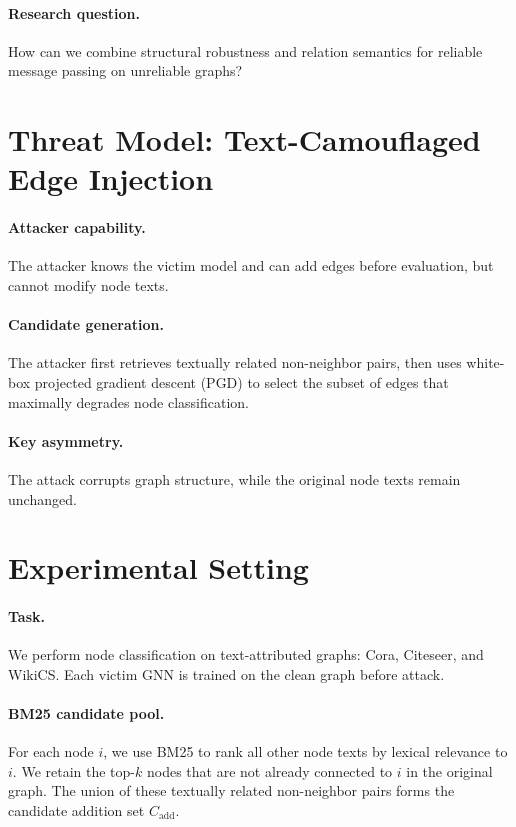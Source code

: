 \documentclass{article}
\begin{document}
\paragraph{Research question.}
How can we combine structural robustness and relation semantics for reliable
message passing on unreliable graphs?

\section{Threat Model: Text-Camouflaged Edge Injection}

\paragraph{Attacker capability.}
The attacker knows the victim model and can add edges before evaluation, but
cannot modify node texts.

\paragraph{Candidate generation.}
The attacker first retrieves textually related non-neighbor pairs, then uses
white-box projected gradient descent (PGD) to select the subset of edges that
maximally degrades node classification.

\paragraph{Key asymmetry.}
The attack corrupts graph structure, while the original node texts remain
unchanged.

\section{Experimental Setting}

\paragraph{Task.}
We perform node classification on text-attributed graphs: Cora, Citeseer, and
WikiCS. Each victim GNN is trained on the clean graph before attack.

\paragraph{BM25 candidate pool.}
For each node $i$, we use BM25 to rank all other node texts by lexical
relevance to $i$. We retain the top-$k$ nodes that are not already connected
to $i$ in the original graph. The union of these textually related non-neighbor
pairs forms the candidate addition set $C_{\mathrm{add}}$.
\end{document}
